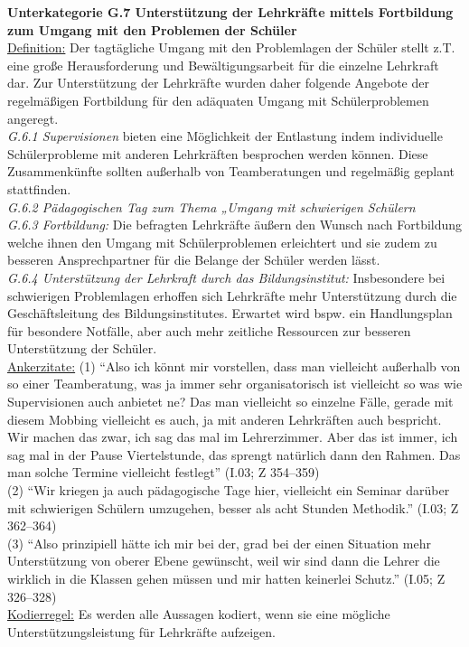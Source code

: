 \textbf{Unterkategorie G.7 Unterstützung der Lehrkräfte mittels Fortbildung zum Umgang mit den Problemen der Schüler}\\
\underline{Definition:} Der tagtägliche Umgang mit den Problemlagen der Schüler stellt z.T. eine große Herausforderung und Bewältigungsarbeit für die einzelne Lehrkraft dar. Zur Unterstützung der Lehrkräfte wurden daher folgende Angebote der regelmäßigen Fortbildung für den adäquaten Umgang mit Schülerproblemen angeregt.\\
\textit{G.6.1 Supervisionen} bieten eine Möglichkeit der Entlastung indem individuelle Schülerprobleme mit anderen Lehrkräften besprochen werden können. Diese Zusammenkünfte sollten außerhalb von Teamberatungen und regelmäßig geplant stattfinden.\\
\textit{G.6.2 Pädagogischen Tag zum Thema „Umgang mit schwierigen Schülern}\\
\textit{G.6.3 Fortbildung:} Die befragten Lehrkräfte äußern den Wunsch nach Fortbildung welche ihnen den Umgang mit Schülerproblemen erleichtert und sie zudem zu besseren Ansprechpartner für die Belange der Schüler werden lässt.\\
\textit{G.6.4 Unterstützung der Lehrkraft durch das Bildungsinstitut:} Insbesondere bei schwierigen Problemlagen erhoffen sich Lehrkräfte mehr Unterstützung durch die Geschäftsleitung des Bildungsinstitutes. Erwartet wird bspw. ein Handlungsplan für besondere Notfälle, aber auch mehr zeitliche Ressourcen zur besseren Unterstützung der Schüler.\\
\underline{Ankerzitate:} (1) "`Also ich könnt mir vorstellen, dass man vielleicht außerhalb von so einer Teamberatung, was ja immer sehr organisatorisch ist vielleicht so was wie Supervisionen auch anbietet ne? Das man vielleicht so einzelne Fälle, gerade mit diesem Mobbing vielleicht es auch, ja mit anderen Lehrkräften auch bespricht. Wir machen das zwar, ich sag das mal im Lehrerzimmer. Aber das ist immer, ich sag mal in der Pause Viertelstunde, das sprengt natürlich dann den Rahmen. Das man solche Termine vielleicht festlegt"' (I.03; Z 354--359)\\ (2) "`Wir kriegen ja auch pädagogische Tage hier, vielleicht ein Seminar darüber mit schwierigen Schülern umzugehen, besser als acht Stunden Methodik."' (I.03; Z 362--364)\\ (3) "`Also prinzipiell hätte ich mir bei der, grad bei der einen Situation mehr Unterstützung von oberer Ebene gewünscht, weil wir sind dann die Lehrer die wirklich in die Klassen gehen müssen und mir hatten keinerlei Schutz."' (I.05; Z 326--328)\\
\underline{Kodierregel:} Es werden alle Aussagen kodiert, wenn sie eine mögliche Unterstützungsleistung für Lehrkräfte aufzeigen.\\

